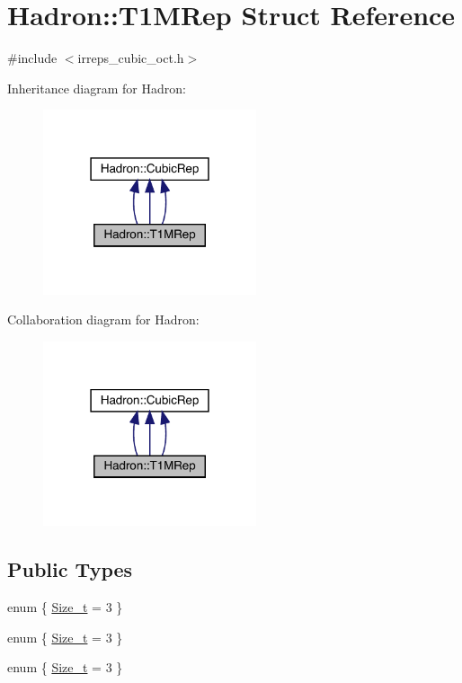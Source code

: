 \hypertarget{structHadron_1_1T1MRep}{}\section{Hadron\+:\+:T1\+M\+Rep Struct Reference}
\label{structHadron_1_1T1MRep}


{\ttfamily \#include $<$irreps\+\_\+cubic\+\_\+oct.\+h$>$}



Inheritance diagram for Hadron\+:
\nopagebreak
\begin{figure}[H]
\begin{center}
\leavevmode
\includegraphics[width=178pt]{d6/d10/structHadron_1_1T1MRep__inherit__graph}
\end{center}
\end{figure}


Collaboration diagram for Hadron\+:
\nopagebreak
\begin{figure}[H]
\begin{center}
\leavevmode
\includegraphics[width=178pt]{de/d08/structHadron_1_1T1MRep__coll__graph}
\end{center}
\end{figure}
\subsection*{Public Types}
\begin{DoxyCompactItemize}
\item 
enum \{ \mbox{\hyperlink{structHadron_1_1T1MRep_a05ec47cf1028a1cca93ceea33163c90ba58d6b01db078a0bdeff5761be3766496}{Size\+\_\+t}} = 3
 \}
\item 
enum \{ \mbox{\hyperlink{structHadron_1_1T1MRep_a05ec47cf1028a1cca93ceea33163c90ba58d6b01db078a0bdeff5761be3766496}{Size\+\_\+t}} = 3
 \}
\item 
enum \{ \mbox{\hyperlink{structHadron_1_1T1MRep_a05ec47cf1028a1cca93ceea33163c90ba58d6b01db078a0bdeff5761be3766496}{Size\+\_\+t}} = 3
 \}
\end{DoxyCompactItemize}
